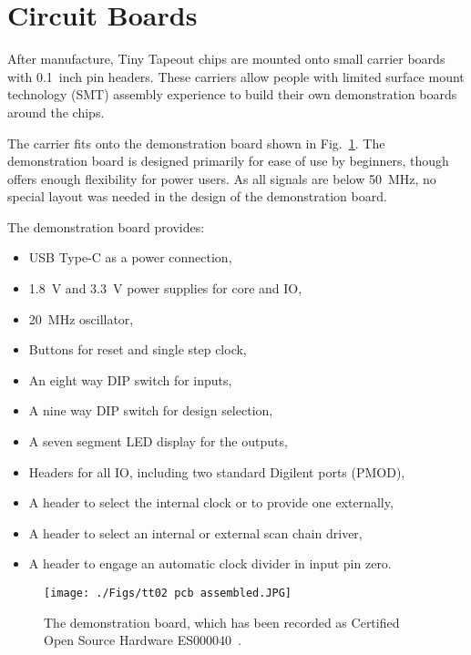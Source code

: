 \section{Circuit Boards}
\label{sec:circuit_board}
After manufacture, Tiny Tapeout chips are mounted onto small carrier boards with 0.1~inch pin headers. These carriers allow people with limited surface mount technology (SMT) assembly experience to build their own demonstration boards around the chips.

The carrier fits onto the demonstration board shown in Fig.~\ref{fig:demonstration_board}. The demonstration board is designed primarily for ease of use by beginners, though offers enough flexibility for power users. As all signals are below \qty{50}{\MHz}, no special layout was needed in the design of the demonstration board.

The demonstration board provides:
\begin{itemize}
\item USB Type-C as a power connection,
\item \qty{1.8}{\V} and \qty{3.3}{\V} power supplies for core and IO,
\item \qty{20}{\MHz} oscillator,
\item Buttons for reset and single step clock,
\item An eight way DIP switch for inputs,
\item A nine way DIP switch for design selection,
\item A seven segment LED display for the outputs,
\item Headers for all IO, including two standard Digilent ports (PMOD),
\item A header to select the internal clock or to provide one externally,
\item A header to select an internal or external scan chain driver,
\item A header to engage an automatic clock divider in input pin zero.
\end{itemize}

\begin{figure}[!t]
\centering
\texttt{[image: ./Figs/tt02 pcb assembled.JPG]}
\caption{The demonstration board, which has been recorded as Certified Open Source Hardware ES000040~\cite{oshwacertification}.}
\label{fig:demonstration_board}
\end{figure}
